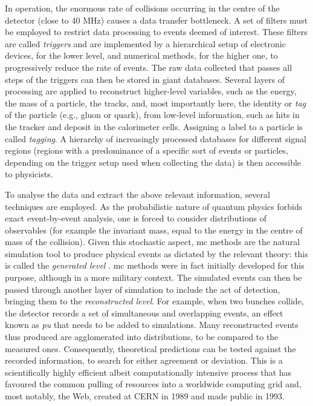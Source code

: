 In operation, the enormous rate of collisions occurring in the centre of the detector (close to 40 MHz) causes a data transfer bottleneck. A set of filters must be employed to restrict data processing to events deemed of interest. These filters are called \textit{triggers} and are implemented by a hierarchical setup of electronic devices, for the lower level, and numerical methods, for the higher one, to progressively reduce the rate of events. The raw data collected that passes all steps of the triggers can then be stored in giant databases. Several layers of processing are applied to reconstruct higher-level variables, such as the energy, the mass of a particle, the tracks, and, most importantly here, the identity or \textit{tag} of the particle (e.g., gluon or quark), from low-level information, such as hits in the tracker and deposit in the calorimeter cells. Assigning a label to a particle is called \textit{tagging}. A hierarchy of increasingly processed databases for different signal regions (regions with a predominance of a specific sort of events or particles, depending on the trigger setup used when collecting the data) is then accessible to physicists. 

To analyse the data and extract the above relevant information, several techniques are employed. As the probabilistic nature of quantum physics forbids exact event-by-event analysis, one is forced to consider distributions of observables (for example the invariant mass, equal to the energy in the centre of mass of the collision). Given this stochastic aspect, \gls{mc} methods are the natural simulation tool to produce physical events as dictated by the relevant theory: this is called the \textit{generated level} \cite{Ay:2010zza}. \gls{mc} methods were in fact initially developed for this purpose, although in a more military context. The simulated events can then be passed through another layer of simulation to include the act of detection, bringing them to the \textit{reconstructed level}. For example, when two bunches collide, the detector records a set of simultaneous and overlapping events, an effect known as \textit{\gls{pu}} that needs to be added to simulations. Many reconstructed events thus produced are agglomerated into distributions, to be compared to the measured ones. Consequently, theoretical predictions can be tested against the recorded information, to search for either agreement or deviation. This is a scientifically highly efficient albeit computationally intensive process that has favoured the common pulling of resources into a worldwide computing grid and, most notably, the Web, created at CERN in 1989 and made public in 1993. 

